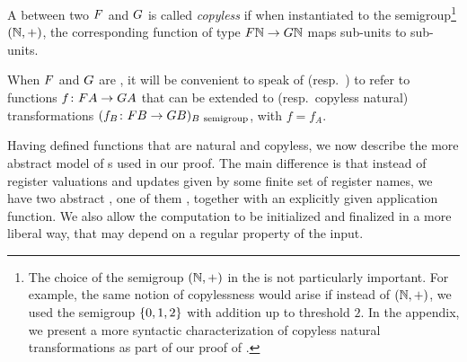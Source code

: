 \begin{definition} \label{def:copyless} A
   between two  $\functor$
  and $\functorg$ is called \emph{copyless} if when instantiated to the
  semigroup\footnote{The choice of the semigroup $({\mathbb N},+)$ in the
     is not particularly important. For example, the same
    notion of copylessness would arise if instead of $({\mathbb N},+)$, we used the
    semigroup $\{0,1,2\}$ with addition up to threshold $2$. In the appendix,
    we present a more syntactic characterization of copyless natural
    transformations as part of our proof of .}
  $({\mathbb N},+)$, the corresponding function of type $\functor \Nat \to
  \functorg \Nat$ maps sub-units to sub-units.
\end{definition}

\AP When $\functor$ and $\functorg$ are , it will be
convenient to speak of  (resp.\ ) to refer to functions $f\colon \functor A \to \functorg A$ that
can be extended to  (resp.\ copyless natural) transformations
$(f_B\colon \functor B \to \functorg B)_{B\ \text{semigroup}}$, with $f=f_A$.

Having defined functions that are natural and copyless, we now describe the more
abstract model of \sst{}s used in our proof. The main difference is that instead
of register valuations and updates given by some finite set of register names,
we have two abstract , one of them ,
together with an explicitly given application function. We also allow the
computation to be initialized and finalized in a more liberal way, that may depend on a
regular property of the input.

